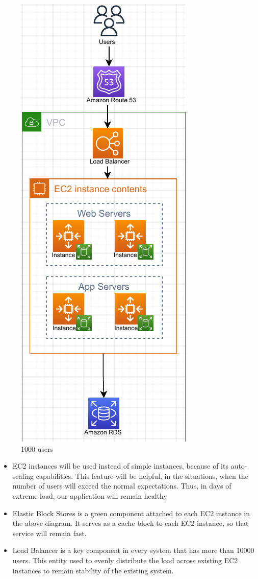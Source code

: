 \begin{figure}[h]
    \centering
    \includegraphics[scale=0.85]{figures/d2.pdf}
    \caption{1000 users}
    \label{fig:gp}
\end{figure}

\begin{itemize}
  \item EC2 instances will be used instead of simple instances, because of its auto-scaling capabilities. This feature will be helpful, in the situations, when the number of users will exceed the normal expectations. Thus, in days of extreme load, our application will remain healthy
  \item Elastic Block Stores is a green component attached to each EC2 instance in the above diagram. It serves as a cache block to each EC2 instance, so that service will remain fast.
  \item Load Balancer is a key component in every system that has more than 10000 users. This entity used to evenly distribute the load across existing EC2 instances to remain stability of the existing system.
\end{itemize}

